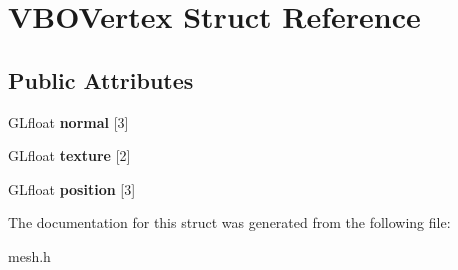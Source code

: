 \hypertarget{structVBOVertex}{\section{V\-B\-O\-Vertex Struct Reference}
\label{structVBOVertex}
}
\subsection*{Public Attributes}
\begin{DoxyCompactItemize}
\item 
\hypertarget{structVBOVertex_abf03d625c89963c0b39d4d3cd59fafb2}{G\-Lfloat {\bfseries normal} \mbox{[}3\mbox{]}}\label{structVBOVertex_abf03d625c89963c0b39d4d3cd59fafb2}

\item 
\hypertarget{structVBOVertex_a66eb5e96270293ec950bbd9fe1773424}{G\-Lfloat {\bfseries texture} \mbox{[}2\mbox{]}}\label{structVBOVertex_a66eb5e96270293ec950bbd9fe1773424}

\item 
\hypertarget{structVBOVertex_aa0ce514d26cbbdbfab7ffba3c5b53e2e}{G\-Lfloat {\bfseries position} \mbox{[}3\mbox{]}}\label{structVBOVertex_aa0ce514d26cbbdbfab7ffba3c5b53e2e}

\end{DoxyCompactItemize}


The documentation for this struct was generated from the following file\-:\begin{DoxyCompactItemize}
\item 
mesh.\-h\end{DoxyCompactItemize}
